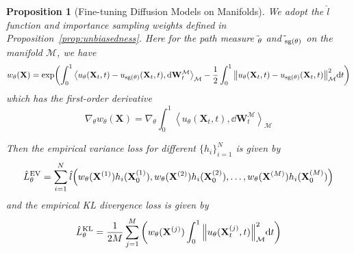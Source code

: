 \documentclass{article}
\theoremstyle{plain}
\newtheorem{proposition}[theorem]{Proposition}
\theoremstyle{definition}
\theoremstyle{remark}
\let\P\relax
\DeclareMathOperator{\P}{\mathbb{P}}
\DeclareMathOperator{\sg}{\mathrm{sg}}
\newcommand{\inner}[2]{\left\langle #1, #2\right\rangle}
\begin{document}
\begin{proposition}[Fine-tuning Diffusion Models on Manifolds]\label{prop:diffusion_model_finetune}
    We adopt the $\hat{l}$ function and importance sampling weights defined in Proposition~\ref{prop:unbiasedness}. Here for the path measure $\tilde{\P}_\theta$ and $\tilde{\P}_{\sg(\theta)}$ on the manifold $\mathcal{M}$, we have
    \begin{equation}
        w_\theta(\mathbf{X}) = \exp(\int_0^1 \inner{u_\theta(\mathbf{X}_t, t)-u_{\sg(\theta)}(\mathbf{X}_t, t)}{\dd \mathbf{W}_t^\mathcal{M}}_\mathcal{M} -\frac{1}{2}\int_0^1 \norm{u_\theta(\mathbf{X}_t, t)-u_{\sg(\theta)}(\mathbf{X}_t, t)}^2_\mathcal{M} \dd t)
    \end{equation}
    which has the first-order derivative
    \begin{equation}
        \nabla_\theta w_\theta(\mathbf{X}) = \nabla_\theta \int_0^1 \inner{u_\theta(\mathbf{X}_t, t)}{\dd \mathbf{W}_t^\mathcal{M}}_\mathcal{M}
    \end{equation}
    
    Then the empirical variance loss for different $\{h_i\}_{i=1}^N$ is given by
    \begin{equation}
        \hat{L}_\theta^\text{EV} = \sum_{i=1}^{N}\hat{l}\qty(w_\theta(\mathbf{X}^{(1)})h_i(\mathbf{X}_0^{(1)}), w_\theta(\mathbf{X}^{(2)})h_i(\mathbf{X}_0^{(2)}), \dots, w_\theta(\mathbf{X}^{(M)})h_i(\mathbf{X}_0^{(M)}))
    \end{equation}
    and the empirical KL divergence loss is given by
    \begin{equation}
        \hat{L}_\theta^\text{KL} = \frac{1}{2M} \sum_{j=1}^M \qty(w_\theta(\mathbf{X}^{(j)}) \int_0^1 \norm{u_\theta(\mathbf{X}_t^{(j)}, t)}_\mathcal{M}^2 \dd t)
    \end{equation}
\end{proposition}

\end{document}
